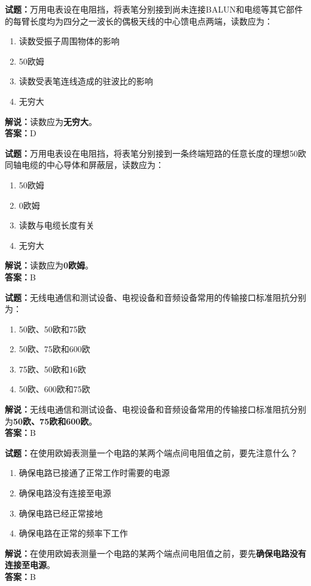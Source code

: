 \documentclass{ctexbook}
\begin{document}
\bigskip



\noindent\textbf{试题：}万用电表设在电阻挡，将表笔分别接到尚未连接BALUN和电缆等其它部件的每臂长度均为四分之一波长的偶极天线的中心馈电点两端，读数应为：
\begin{enumerate}[leftmargin=3em]
	\item 读数受振子周围物体的影响
	\item 50欧姆
	\item 读数受表笔连线造成的驻波比的影响
	\item 无穷大
\end{enumerate}
\noindent\textbf{解说：}读数应为\textbf{无穷大}。\\\noindent\textbf{答案：}D


\bigskip



\noindent\textbf{试题：}万用电表设在电阻挡，将表笔分别接到一条终端短路的任意长度的理想50欧同轴电缆的中心导体和屏蔽层，读数应为：
\begin{enumerate}[leftmargin=3em]
	\item 50欧姆
	\item 0欧姆
	\item 读数与电缆长度有关
	\item 无穷大
\end{enumerate}
\noindent\textbf{解说：}读数应为\textbf{0欧姆}。\\\noindent\textbf{答案：}B


\bigskip



\noindent\textbf{试题：}无线电通信和测试设备、电视设备和音频设备常用的传输接口标准阻抗分别为：
\begin{enumerate}[leftmargin=3em]
	\item 50欧、50欧和75欧
	\item 50欧、75欧和600欧
	\item 75欧、50欧和16欧
	\item 50欧、600欧和75欧
\end{enumerate}
\noindent\textbf{解说：}无线电通信和测试设备、电视设备和音频设备常用的传输接口标准阻抗分别为\textbf{50欧、75欧和600欧}。\\\noindent\textbf{答案：}B


\bigskip



\noindent\textbf{试题：}在使用欧姆表测量一个电路的某两个端点间电阻值之前，要先注意什么？
\begin{enumerate}[leftmargin=3em]
	\item 确保电路已接通了正常工作时需要的电源
	\item 确保电路没有连接至电源
	\item 确保电路已经正常接地
	\item 确保电路在正常的频率下工作
\end{enumerate}
\noindent\textbf{解说：}在使用欧姆表测量一个电路的某两个端点间电阻值之前，要先\textbf{确保电路没有连接至电源}。\\\noindent\textbf{答案：}B
\end{document}
